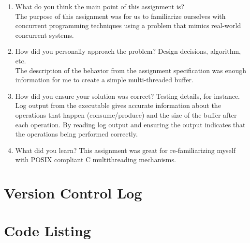 \documentclass[letterpaper,10pt]{article}
\begin{document}
\begin{enumerate}
  \item{What do you think the main point of this assignment is?}\\
  The purpose of this assignment was for us to familiarize ourselves with concurrent programming techniques using a problem that mimics real-world concurrent systems.
  \item{How did you personally approach the problem? Design decisions, algorithm, etc.}\\
  The description of the behavior from the assignment specification was enough information for me to create a simple multi-threaded buffer.
  \item{How did you ensure your solution was correct? Testing details, for instance.}
  Log output from the executable gives accurate information about the operations that happen (consume/produce) and the size of the buffer after each operation.  By reading log output and ensuring the output indicates that the operations being performed correctly.
  \item{What did you learn?}
  This assignment was great for re-familiarizing myself with POSIX compliant C multithreading mechanisms.
\end{enumerate}
\section*{Version Control Log}

\section*{Code Listing}
\end{document}
